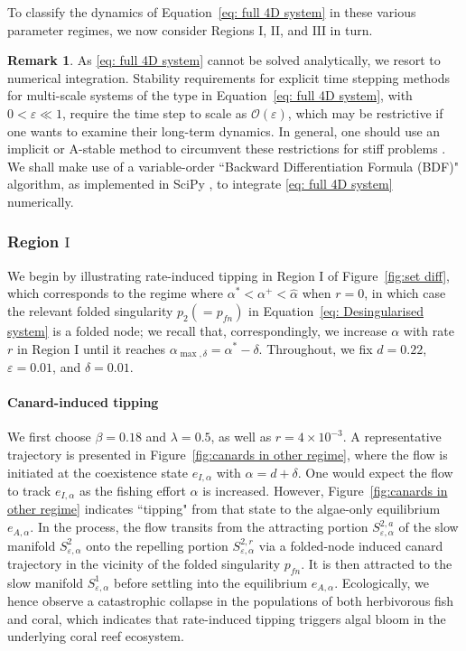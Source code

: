 \documentclass{article}
\theoremstyle{definition}
\numberwithin{equation}{section}
\newtheorem{remark}[prop]{Remark}
\begin{document}
To classify the dynamics of Equation~\eqref{eq: full 4D system} in these various parameter regimes, we now consider Regions $\mathrm{I}$, $\mathrm{II}$, and $\mathrm{III}$ in turn.

\begin{remark}
As \eqref{eq: full 4D system} cannot be solved analytically, we resort to numerical integration. Stability requirements for explicit time stepping methods for multi-scale systems of the type in Equation~\eqref{eq: full 4D system}, with $0<\varepsilon\ll 1$, require the time step to scale as $\mathcal{O}(\varepsilon)$, which may be restrictive if one wants to examine their long-term dynamics. In general, one should use an implicit or A-stable method to circumvent these restrictions for stiff problems \cite{MR2478556}. We shall make use of a variable-order ``Backward Differentiation Formula (BDF)" algorithm, as implemented in SciPy \cite{doi:10.1137/S1064827594276424,2020SciPy-NMeth}, to integrate \eqref{eq: full 4D system} numerically.
\end{remark}


\subsubsection{Region \texorpdfstring{$\mathrm{I}$}{I}}
\label{sec: canard 1}
We begin by illustrating rate-induced tipping in Region $\mathrm{I}$ of Figure~\ref{fig:set diff}, which corresponds to the regime where $\alpha^\ast<\alpha^{+}<\hat\alpha$ when $r=0$, in which case the relevant folded singularity $p_2(=p_{fn})$ in Equation~\eqref{eq: Desingularised system} is a folded node; we recall that, correspondingly, we increase $\alpha$ with rate $r$ in Region $\mathrm{I}$ until it reaches $\alpha_{\max,\delta}=\alpha^{\ast}-\delta$. Throughout, we fix $d=0.22$, $\varepsilon=0.01$, and $\delta=0.01$.

\paragraph{Canard-induced tipping}
We first choose $\beta=0.18$ and $\lambda=0.5$, as well as $r=4\times10^{-3}$. A representative trajectory is presented in Figure~\ref{fig:canards in other regime}, where the flow is initiated at the coexistence state $e_{I,\alpha}$ with $\alpha=d+\delta$. One would expect the flow to track $e_{I,\alpha}$ as the fishing effort $\alpha$ is increased. However, Figure~\ref{fig:canards in other regime} indicates ``tipping" from that state to the algae-only equilibrium $e_{A,\alpha}$. In the process, the flow transits from the attracting portion $S^{2,a}_{\varepsilon,\alpha}$ of the slow manifold $S^2_{\varepsilon,\alpha}$ onto the repelling portion $S^{2,r}_{\varepsilon,\alpha}$ via a folded-node induced canard trajectory in the vicinity of the folded singularity $p_{fn}$. It is then attracted to the slow manifold $S_{\varepsilon,\alpha}^1$ before settling into the equilibrium $e_{A,\alpha}$. Ecologically, we hence observe a catastrophic collapse in the populations of both herbivorous fish and coral, which indicates that rate-induced tipping triggers algal bloom in the underlying coral reef ecosystem. 
\end{document}
